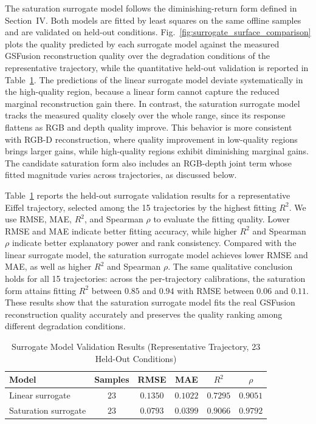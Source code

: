 \documentclass[journal]{IEEEtran}
\begin{document}
The saturation surrogate model follows the diminishing-return form defined in Section~IV. Both models are fitted by least squares on the same offline samples and are validated on held-out conditions. Fig.~\ref{fig:surrogate_surface_comparison} plots the quality predicted by each surrogate model against the measured GSFusion reconstruction quality over the degradation conditions of the representative trajectory, while the quantitative held-out validation is reported in Table~\ref{tab:surrogate_validation_results}. The predictions of the linear surrogate model deviate systematically in the high-quality region, because a linear form cannot capture the reduced marginal reconstruction gain there. In contrast, the saturation surrogate model tracks the measured quality closely over the whole range, since its response flattens as RGB and depth quality improve. This behavior is more consistent with RGB-D reconstruction, where quality improvement in low-quality regions brings larger gains, while high-quality regions exhibit diminishing marginal gains. The candidate saturation form also includes an RGB-depth joint term whose fitted magnitude varies across trajectories, as discussed below.

Table~\ref{tab:surrogate_validation_results} reports the held-out surrogate validation results for a representative Eiffel trajectory, selected among the 15 trajectories by the highest fitting $R^2$. We use RMSE, MAE, $R^2$, and Spearman $\rho$ to evaluate the fitting quality. Lower RMSE and MAE indicate better fitting accuracy, while higher $R^2$ and Spearman $\rho$ indicate better explanatory power and rank consistency. Compared with the linear surrogate model, the saturation surrogate model achieves lower RMSE and MAE, as well as higher $R^2$ and Spearman $\rho$. The same qualitative conclusion holds for all 15 trajectories: across the per-trajectory calibrations, the saturation form attains fitting $R^2$ between $0.85$ and $0.94$ with RMSE between $0.06$ and $0.11$. These results show that the saturation surrogate model fits the real GSFusion reconstruction quality accurately and preserves the quality ranking among different degradation conditions.

\begin{table}[t]
\centering
\caption{Surrogate Model Validation Results (Representative Trajectory, 23 Held-Out Conditions)}
\label{tab:surrogate_validation_results}
\begin{tabular}{l c c c c c}
\hline
Model & Samples & RMSE & MAE & $R^2$ & $\rho$ \\
\hline
Linear surrogate & $23$ & $0.1350$ & $0.1022$ & $0.7295$ & $0.9051$ \\
Saturation surrogate & $23$ & $0.0793$ & $0.0399$ & $0.9066$ & $0.9792$ \\
\hline
\end{tabular}
\end{table}
\end{document}
